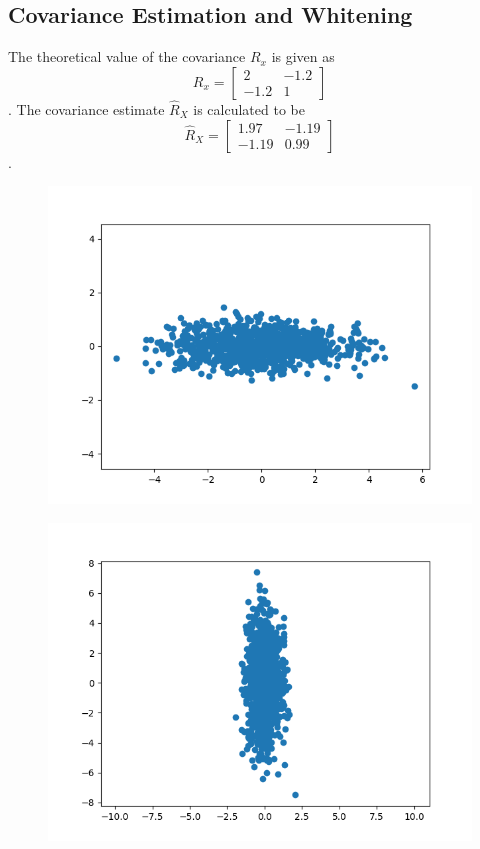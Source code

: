 \documentclass{article}
\begin{document}
\subsection{Covariance Estimation and Whitening}
The theoretical value of the covariance $R_x$ is given as
\begin{equation*}
R_x = 
\begin{bmatrix}
    2 & -1.2 \\
    -1.2 & 1
\end{bmatrix}
\end{equation*}.
The covariance estimate $\hat{R}_X$ is calculated to be
\begin{equation*}
\hat{R}_X = 
\begin{bmatrix}
    1.97 & -1.19 \\
    -1.19 & 0.99
\end{bmatrix}
\end{equation*}.
\begin{figure}[H]
    \centering
    \includegraphics[width=1\textwidth]{../x-tilde-2-2.png}
        \end{figure}
\begin{figure}[H]
    \centering
    \includegraphics[width=1\textwidth]{../w-2-2.png}
\end{figure}
\end{document}
